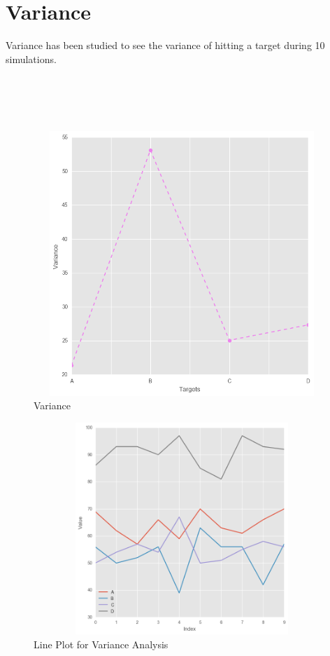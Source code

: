 \documentclass[11pt]{report}
\begin{document}
\section{Variance}
Variance has been studied to see the variance of hitting a target during 10 simulations.\\
\\
\\
\\
\\
\begin{figure}[h!]
  \centering
  \includegraphics[height = 10cm, width = 14cm]{variance.png}
  \caption{Variance}
  \label{fig:variance}
\end{figure}

\begin{figure}[h!]
  \centering
  \includegraphics[height = 8cm, width = 14cm]{lineplot.png}
  \caption{Line Plot for Variance Analysis}
  \label{fig:lineplot}
\end{figure}
\end{document}
